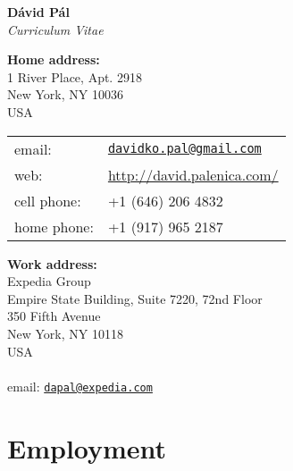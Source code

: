 \documentclass[9pt]{article}
\begin{document}
\begin{center}
{\huge \textbf{D\'avid P\'al}} \\[0.2cm]
\emph{Curriculum Vitae}
\end{center}

\vspace{0.2cm}

%
\noindent
\begin{minipage}[t]{10cm}
\textbf{Home address:} \\
1 River Place, Apt. 2918 \\
New York, NY 10036 \\
USA \\

\begin{tabular}{@{}ll}
email:       & \href{mailto:davidko.pal@gmail.com}{\texttt{davidko.pal@gmail.com}} \\
web:         & \url{http://david.palenica.com/} \\
cell phone:  & +1 (646) 206 4832 \\
home phone:  & +1 (917) 965 2187 \\
\end{tabular}
\end{minipage}
%
\begin{minipage}[t]{10cm}
\textbf{Work address:} \\
Expedia Group \\
Empire State Building, Suite 7220, 72nd Floor \\
350 Fifth Avenue \\
New York, NY 10118 \\
USA \\
\\
email: \href{mailto:dapal@expedia.com}{\texttt{dapal@expedia.com}} \\
\end{minipage}

\section*{Employment}
\end{document}
